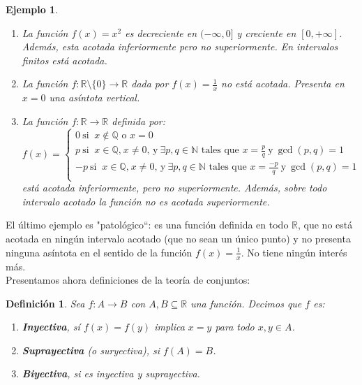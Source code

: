 \documentclass{article}
\newtheorem{define}{Definición}
\newtheorem{ejem}{Ejemplo}
\newcommand{\reales}{\mathbb{R}}
\newcommand{\naturales}{\mathbb{N}}
\newcommand{\racionales}{\mathbb{Q}}
\begin{document}
\begin{ejem}
	\begin{enumerate}
		\item
		La función $f(x) = x^2$ es decreciente en $(-\infty, 0]$ y creciente en $[0, +\infty]$. Además, esta acotada inferiormente pero no superiormente. En intervalos finitos está acotada.
		\item
		La función $f: \reales \setminus \{ 0\} \rightarrow \reales$ dada por $f(x) = \frac{1}{x}$ no está acotada. Presenta en $x = 0$ una asíntota vertical.
		\item
		La función $f: \reales \rightarrow \reales$ definida por:
		\begin{equation*}
			f(x) = \left\lbrace
			\begin{array}{l}
			0\ \text{si }\ x \not \in \racionales \text{ o } x = 0\\
			p\ \text{si }\ x \in \racionales \text{,}\ x \neq 0 \text{, y}\ \exists p,q \in \naturales \text{ tales que } x = \frac{p}{q}\  \text{y}\ \gcd(p,q) = 1\\
			-p\ \text{si }\ x \in \racionales \text{,}\ x \neq 0 \text{, y}\ \exists p,q \in \naturales \text{ tales que } x = \frac{-p}{q}\  \text{y}\ \gcd(p,q) = 1 \\
			\end{array}
			\right.
		\end{equation*}
		está acotada inferiormente, pero no superiormente. Además, sobre todo intervalo acotado la función no es acotada superiormente.
	\end{enumerate}
\end{ejem}

El último ejemplo es "patológico``: es una función definida en todo $\reales$, que no está acotada en ningún intervalo acotado (que no sean un único punto) y no presenta ninguna asíntota en el sentido de la función $f(x) = \frac{1}{x}$. No tiene ningún interés más.\\ 
Presentamos ahora definiciones de la teoría de conjuntos:
\begin{define}
	Sea $f:A \rightarrow B$ con $A,B \subseteq \reales$ una función. Decimos que $f$ es:
	\begin{enumerate}
		\item
		\textbf{Inyectiva}, sí $f(x) = f(y)$ implica $x = y$ para todo $x,y \in A$.
		\item
		\textbf{Suprayectiva} (o suryectiva), si $f(A) = B$.
		\item
		\textbf{Biyectiva}, si es inyectiva y suprayectiva.
	\end{enumerate}
\end{define}
\end{document}
